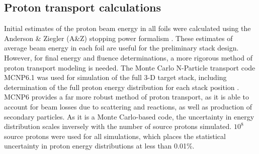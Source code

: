 \subsection{Proton transport calculations}\label{sec:proton_transport}


Initial estimates of the proton beam energy in all foils were calculated using the Anderson \& Ziegler (A\&Z) stopping power formalism \cite{Andersen_Ziegler_1977,Ziegler1985,Ziegler1999}.
These estimates of average beam energy in each foil are useful for the preliminary stack design.
However, for final energy and fluence determinations, a more rigorous method of proton transport modeling is needed.
The Monte Carlo N-Particle transport code MCNP6.1 was used for simulation of the full 3-D target stack, including determination of the full proton energy distribution for each stack position   \cite{Goorley2012}.
MCNP6 provides a far more robust method of proton transport, as it is able to account for beam losses due to scattering and reactions, as well as production of secondary particles.
As it is a Monte Carlo-based code, the uncertainty in energy distribution scales inversely with the number of source protons simulated.  $10^8$ source protons were used for all simulations, which places the statistical uncertainty in proton energy distributions at less than 0.01\%.



